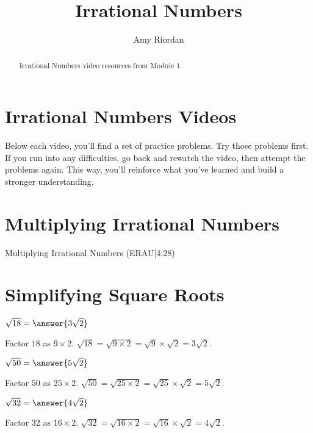 \documentclass{ximera}
\title{Irrational Numbers}
\author{Amy Riordan}
\begin{document}
\begin{abstract}
Irrational Numbers video resources from Module 1.
\end{abstract}
\maketitle

\section*{Irrational Numbers Videos}

Below each video, you’ll find a set of practice problems. Try those problems first. If you run into any difficulties, go back and rewatch the video, then attempt the problems again. This way, you’ll reinforce what you’ve learned and build a stronger understanding.

\section*{Multiplying Irrational Numbers}

Multiplying Irrational Numbers (ERAU|4:28)



\section*{Simplifying Square Roots}

\begin{problem}
$\sqrt{18} = \answer{3\sqrt{2}}$

\begin{feedback}
Factor $18$ as $9 \times 2$. $\sqrt{18} = \sqrt{9 \times 2} = \sqrt{9} \times \sqrt{2} = 3\sqrt{2}$.
\end{feedback}
\end{problem}

\begin{problem}
$\sqrt{50} = \answer{5\sqrt{2}}$

\begin{feedback}
Factor $50$ as $25 \times 2$. $\sqrt{50} = \sqrt{25 \times 2} = \sqrt{25} \times \sqrt{2} = 5\sqrt{2}$.
\end{feedback}
\end{problem}

\begin{problem}
$\sqrt{32} = \answer{4\sqrt{2}}$

\begin{feedback}
Factor $32$ as $16 \times 2$. $\sqrt{32} = \sqrt{16 \times 2} = \sqrt{16} \times \sqrt{2} = 4\sqrt{2}$.
\end{feedback}
\end{problem}
\end{document}
